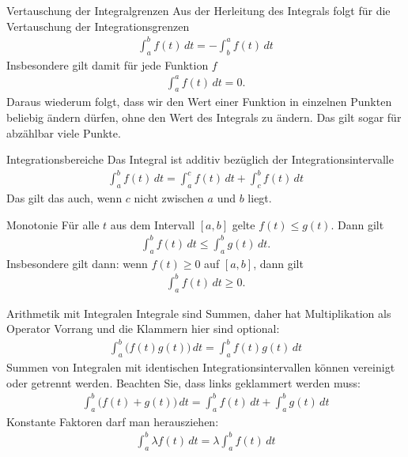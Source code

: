 \begin{frame}{Vertauschung der Integralgrenzen}
  Aus der Herleitung des Integrals folgt für die Vertauschung der Integrationsgrenzen
  \begin{gather*}
      \int_a^b f(t)\,dt = - \int _b^a f(t)\,dt
  \end{gather*}
  Insbesondere gilt damit für jede Funktion $f$
  \begin{gather*}
      \int_a^a f(t)\,dt = 0.
  \end{gather*}
  Daraus wiederum folgt, dass wir den Wert einer Funktion in einzelnen Punkten beliebig ändern dürfen, ohne den Wert des Integrals zu ändern. Das gilt sogar für abzählbar viele Punkte.
\end{frame}

\begin{frame}{Integrationsbereiche}
  Das Integral ist \glqq{}additiv\grqq{} bezüglich der Integrationsintervalle
  \begin{gather*}
      \int_a^b f(t)\,dt = \int_a^c f(t)\,dt + \int_c^b f(t)\,dt
  \end{gather*}
  Das gilt das auch, wenn $c$ nicht zwischen $a$ und $b$ liegt.
\end{frame}

\begin{frame}{Monotonie}
    Für alle $t$ aus dem Intervall $[a,b]$ gelte $f(t) \le g(t)$. Dann gilt
    \begin{gather*}
        \int_a^b f(t)\,dt \le \int_a^b g(t)\,dt.
    \end{gather*}
    \pause
    Insbesondere gilt dann: wenn $f(t) \ge 0$ auf $[a,b]$, dann gilt
    \begin{gather*}
        \int_a^b f(t)\,dt \ge 0.
    \end{gather*}
\end{frame}

\begin{frame}{Arithmetik mit Integralen}
    Integrale sind Summen, daher hat Multiplikation als Operator Vorrang und die Klammern hier sind optional:
    \begin{gather*}
        \int_a^b \bigl(f(t)g(t)\bigr)\,dt = \int_a^b f(t)g(t)\,dt
    \end{gather*}
    Summen von Integralen mit identischen Integrationsintervallen können vereinigt oder getrennt werden. Beachten Sie, dass links geklammert werden muss:
    \begin{gather*}
        \int_a^b \bigl(f(t)+g(t)\bigr)\,dt
        =
        \int_a^b f(t)\,dt + \int_a^b g(t)\,dt
    \end{gather*}
    Konstante Faktoren darf man \glqq{}herausziehen\grqq{}:
    \begin{gather*}
        \int_a^b \lambda f(t)\,dt = \lambda\int_a^b f(t)\,dt
    \end{gather*}
\end{frame}

